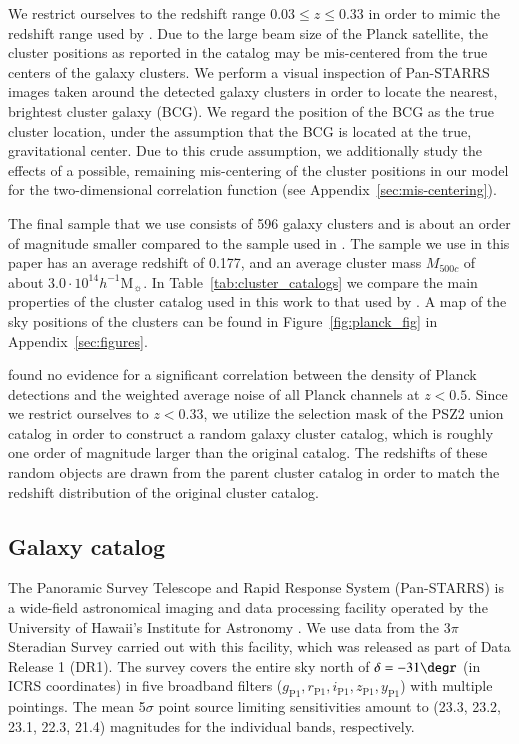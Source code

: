 \documentclass[iop, apjl, twocolappendix, numberedappendix]{emulateapj}
\begin{document}
We restrict ourselves to the redshift range $0.03 \leq z \leq 0.33$
in order to mimic the redshift range used by
\citet{more2016detection}. Due to the large beam size of the Planck
satellite, the cluster positions as reported in the catalog may be
mis-centered from the true centers of the galaxy clusters. We perform
a visual inspection of Pan-STARRS images taken around the detected
galaxy clusters in order to locate the nearest, brightest cluster
galaxy (BCG). We regard the position of the BCG as the true cluster
location, under the assumption that the BCG is located at the true,
gravitational center. Due to this crude assumption, we additionally 
study the effects of a possible, remaining mis-centering of the 
cluster positions in our model for the two-dimensional correlation 
function (see Appendix~\ref{sec:mis-centering}). 

The final sample that we use consists of 596
galaxy clusters and is about an order of magnitude smaller compared
to the sample used in \citet{more2016detection}. The sample we use
in this paper has an average redshift of 0.177, and an average
cluster mass $M_{500c}$ of about $3.0 \cdot 10^{14}
h^{-1}$M$_{\sun}$. In Table~\ref{tab:cluster_catalogs} we compare
the main properties of the cluster catalog used in this work to that
used by \citet{more2016detection}. A map of the sky positions of the clusters
can be found in Figure~\ref{fig:planck_fig} in
Appendix~\ref{sec:figures}. 

\citet{kosyra2015environment} found no evidence for a significant
correlation between the density of Planck detections and the
weighted average noise of all Planck channels at $z<0.5$. Since we
restrict ourselves to $z<0.33$, we utilize the selection mask of the
PSZ2 union catalog in order to construct a random galaxy cluster
catalog, which is roughly one order of magnitude larger than the
original catalog. The redshifts of these random objects are drawn
from the parent cluster catalog in order to match the redshift
distribution of the original cluster catalog. 

\subsection{Galaxy catalog}
\label{sec:galaxies}
The Panoramic Survey Telescope and Rapid Response System
(Pan-STARRS) is a wide-field astronomical imaging and data
processing facility operated by the University of Hawaii's Institute
for Astronomy \citep{kaiser2002pan,kaiser2010pan}. We use data from
the 3$\pi$ Steradian Survey carried out with this facility, which
was released as part of Data Release 1 (DR1). The survey covers the
entire sky north of $\delta=-31\degr$ (in ICRS coordinates) in five
broadband filters ($g_{\mathrm{P1}}, r_{\mathrm{P1}},
i_{\mathrm{P1}}, z_{\mathrm{P1}}, y_{\mathrm{P1}}$) with multiple
pointings. The mean 5$\sigma$ point source limiting sensitivities
amount to (23.3, 23.2, 23.1, 22.3, 21.4) magnitudes for the
individual bands, respectively. 
\end{document}
